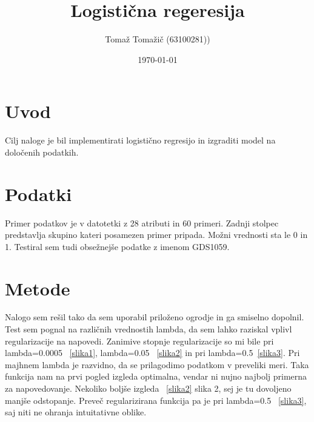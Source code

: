 \documentclass[a4paper,11pt]{article}
\title{Logistična regeresija}
\author{Tomaž Tomažič (63100281))}
\date{\today}
\begin{document}
\maketitle

\section{Uvod}

Cilj naloge je bil implementirati logistično regresijo in izgraditi model na določenih podatkih.
\section{Podatki}

Primer podatkov je v datotetki z 28 atributi in 60 primeri. Zadnji stolpec predstavlja skupino kateri posamezen primer pripada. Možni vrednosti sta le 0 in 1. Testiral sem tudi obsežnejše podatke z imenom GDS1059.

\section{Metode}

Nalogo sem rešil tako da sem uporabil priloženo ogrodje in ga smiselno dopolnil. Test sem pognal na različnih vrednostih lambda, da sem lahko raziskal vplivl regularizacije na napovedi. Zanimive stopnje regularizacije so mi bile pri lambda=0.0005 ~\ref{slika1}, lambda=0.05 ~\ref{slika2} in pri lambda=0.5~\ref{slika3}. Pri majhnem lambda je razvidno, da se prilagodimo podatkom v preveliki meri. Taka funkcija nam na prvi pogled izgleda optimalna, vendar ni nujno najbolj primerna za napovedovanje. Nekoliko boljše izgleda ~\ref{slika2} slika 2,  sej je tu dovoljeno manjše odstopanje. Preveč regularizirana funkcija pa je pri lambda=0.5 ~\ref{slika3}, saj niti ne ohranja intuitativne oblike.
\end{document}
